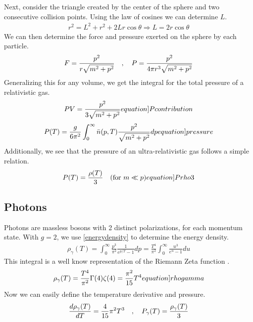 Next, consider the triangle created by the center of the sphere and two consecutive collision points. Using the law of cosines we can determine $L$.
\begin{align}
    r^2=L^2+r^2+2L r \cos \theta \Rightarrow
    L = 2r \cos \theta
\end{align}
We can then determine the force and pressure exerted on the sphere by each particle. 
\begin{align}
    F = \frac{p^2}{r\sqrt{m^2+p^2}} \quad , \quad P = \frac{p^2}{4\pi r^3\sqrt{m^2+p^2}}
\end{align}
Generalizing this for any volume, we get the integral for the total pressure of a relativistic gas.
\begin{align}
    PV=\frac{p^2}{3\sqrt{m^2+p^2}} 
    \label[equation]{Pcontribution}
\end{align}
\begin{align}
    P(T)=\frac{g}{6\pi^2}\int_{0}^{\infty}\bar{n}(p,T)\frac{p^2}{\sqrt{m^2+p^2}}dp
    \label[equation]{pressure}
\end{align}
Additionally, we see that the pressure of an ultra-relativistic gas follows a simple relation.
\begin{align}
    P(T)=\frac{\rho(T)}{3} \quad (\text{for } m\ll p)
    \label[equation]{Prho3}
\end{align}

\subsection{Photons}


Photons are massless bosons with 2 distinct polarizations, for each momentum state. With $g=2$, we use \ref{energydensity} to determine the energy density. 
\begin{align}
    \rho_\gamma(T)=\int_{0}^{\infty} \frac{p^3}{\pi^2}\frac{1}{e^{p/T}-1}dp =  \frac{T^4}{\pi^2}\int_{0}^{\infty}\frac{u^3}{e^{u}-1}du
\end{align}
This integral is a well know representation of the Riemann Zeta function \cite[\href{https://dlmf.nist.gov/25.5.E1}{(25.5.1)}]{NIST:DLMF}.
\begin{align}
    \rho_\gamma(T)=\frac{T^4}{\pi^2}\Gamma(4)\zeta(4)=\frac{\pi^2}{15}T^4
    \label[equation]{rhogamma}
\end{align}
Now we can easily define the temperature derivative and pressure.
\begin{align}
    \frac{d\rho_\gamma(T)}{dT}=\frac{4}{15}\pi^2T^3 \quad , \quad P_\gamma(T)=\frac{\rho_\gamma(T)}{3}
\end{align}




